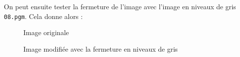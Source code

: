 \documentclass[french,a4paper,10pt]{article}
\begin{document}
	On peut ensuite tester la fermeture de l'image avec l'image en niveaux de gris \texttt{08.pgm}.
	Cela donne alors :
	\begin{figure}[!htb]
		\begin{minipage}{0.48\textwidth}
			\centering
			\caption{Image originale}\label{Fig:orig-08-4}
		\end{minipage}\hfill
		\begin{minipage}{0.48\textwidth}
			\centering
			\caption{Image modifiée avec la fermeture en niveaux de gris}\label{Fig:fermeture-grey-08}
		\end{minipage}
	\end{figure}
\end{document}
